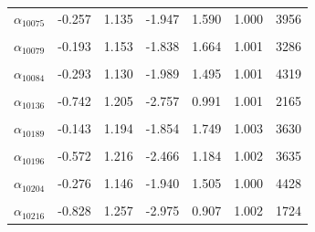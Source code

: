 \begin{longtable}{lrrrrrr}
$\alpha_{10075}$ & -0.257 & 1.135 & -1.947 & 1.590 & 1.000 & 3956\\
\cellcolor{gray!10}{$\alpha_{10078}$} & \cellcolor{gray!10}{-0.240} & \cellcolor{gray!10}{1.146} & \cellcolor{gray!10}{-1.909} & \cellcolor{gray!10}{1.593} & \cellcolor{gray!10}{1.002} & \cellcolor{gray!10}{3590}\\
$\alpha_{10079}$ & -0.193 & 1.153 & -1.838 & 1.664 & 1.001 & 3286\\
\cellcolor{gray!10}{$\alpha_{10081}$} & \cellcolor{gray!10}{-0.297} & \cellcolor{gray!10}{1.160} & \cellcolor{gray!10}{-2.004} & \cellcolor{gray!10}{1.496} & \cellcolor{gray!10}{0.999} & \cellcolor{gray!10}{4416}\\
$\alpha_{10084}$ & -0.293 & 1.130 & -1.989 & 1.495 & 1.001 & 4319\\
\cellcolor{gray!10}{$\alpha_{10112}$} & \cellcolor{gray!10}{-0.213} & \cellcolor{gray!10}{1.164} & \cellcolor{gray!10}{-1.920} & \cellcolor{gray!10}{1.650} & \cellcolor{gray!10}{1.003} & \cellcolor{gray!10}{3532}\\
$\alpha_{10136}$ & -0.742 & 1.205 & -2.757 & 0.991 & 1.001 & 2165\\
\cellcolor{gray!10}{$\alpha_{10167}$} & \cellcolor{gray!10}{-0.186} & \cellcolor{gray!10}{1.190} & \cellcolor{gray!10}{-1.935} & \cellcolor{gray!10}{1.731} & \cellcolor{gray!10}{1.002} & \cellcolor{gray!10}{3633}\\
$\alpha_{10189}$ & -0.143 & 1.194 & -1.854 & 1.749 & 1.003 & 3630\\
\cellcolor{gray!10}{$\alpha_{10195}$} & \cellcolor{gray!10}{-0.869} & \cellcolor{gray!10}{1.275} & \cellcolor{gray!10}{-3.042} & \cellcolor{gray!10}{0.877} & \cellcolor{gray!10}{1.003} & \cellcolor{gray!10}{1652}\\
$\alpha_{10196}$ & -0.572 & 1.216 & -2.466 & 1.184 & 1.002 & 3635\\
\cellcolor{gray!10}{$\alpha_{10200}$} & \cellcolor{gray!10}{-0.609} & \cellcolor{gray!10}{1.180} & \cellcolor{gray!10}{-2.508} & \cellcolor{gray!10}{1.138} & \cellcolor{gray!10}{1.001} & \cellcolor{gray!10}{2884}\\
$\alpha_{10204}$ & -0.276 & 1.146 & -1.940 & 1.505 & 1.000 & 4428\\
\cellcolor{gray!10}{$\alpha_{10208}$} & \cellcolor{gray!10}{-0.828} & \cellcolor{gray!10}{1.245} & \cellcolor{gray!10}{-2.873} & \cellcolor{gray!10}{0.923} & \cellcolor{gray!10}{1.001} & \cellcolor{gray!10}{1673}\\
$\alpha_{10216}$ & -0.828 & 1.257 & -2.975 & 0.907 & 1.002 & 1724\\

\end{longtable}
